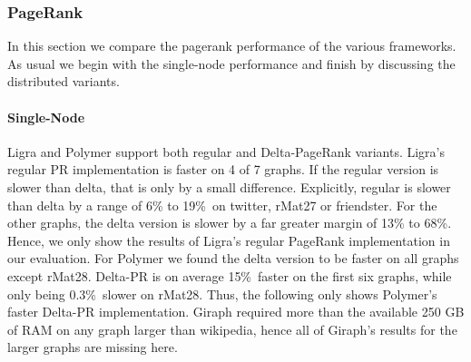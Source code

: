 

\subsubsection{PageRank}
In this section we compare the pagerank performance of the various frameworks. As usual we begin with the single-node performance and finish by discussing the distributed variants.

\paragraph{Single-Node}
Ligra and Polymer support both regular and Delta-PageRank variants.
Ligra's regular PR implementation is faster on 4 of 7 graphs. If the regular version is slower than delta, that is only by a small difference. Explicitly, regular is slower than delta by a range of 6\% to 19\%\ on twitter, rMat27 or friendster. For the other graphs, the delta version is slower by a far greater margin of 13\% to 68\%.
Hence, we only show the results of Ligra's regular PageRank implementation in our evaluation.
For Polymer we found the delta version to be faster on all graphs except rMat28. Delta-PR is on average 15\%\ faster on the first six graphs, while only being 0.3\%\ slower on rMat28.
Thus, the following only shows Polymer's faster Delta-PR implementation.
Giraph required more than the available 250 GB of RAM on any graph larger than wikipedia, hence all of Giraph's results for the larger graphs are missing here.
